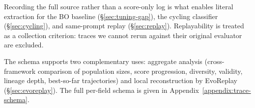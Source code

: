 Recording the full source rather than a score-only log is what enables literal extraction for the BO baseline (\S\ref{sec:tuning-gap}), the cycling classifier (\S\ref{sec:cycling}), and same-prompt replay (\S\ref{sec:replay}). Replayability is treated as a collection criterion: traces we cannot rerun against their original evaluator are excluded.

The schema supports two complementary uses: aggregate analysis (cross-framework comparison of population sizes, score progression, diversity, validity, lineage depth, best-so-far trajectories) and local reconstruction by EvoReplay (\S\ref{sec:evoreplay}). The full per-field schema is given in Appendix~\ref{appendix:trace-schema}.

